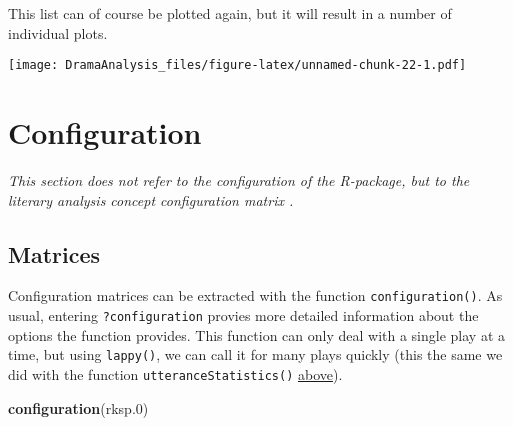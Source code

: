 \documentclass[]{book}
\newenvironment{Shaded}{\begin{snugshade}}{\end{snugshade}}
\newcommand{\ControlFlowTok}[1]{\textcolor[rgb]{0.13,0.29,0.53}{\textbf{#1}}}
\newcommand{\DataTypeTok}[1]{\textcolor[rgb]{0.13,0.29,0.53}{#1}}
\newcommand{\DecValTok}[1]{\textcolor[rgb]{0.00,0.00,0.81}{#1}}
\newcommand{\FloatTok}[1]{\textcolor[rgb]{0.00,0.00,0.81}{#1}}
\newcommand{\KeywordTok}[1]{\textcolor[rgb]{0.13,0.29,0.53}{\textbf{#1}}}
\newcommand{\NormalTok}[1]{#1}
\newcommand{\OperatorTok}[1]{\textcolor[rgb]{0.81,0.36,0.00}{\textbf{#1}}}
\newcommand{\StringTok}[1]{\textcolor[rgb]{0.31,0.60,0.02}{#1}}
\begin{document}
This list can of course be plotted again, but it will result in a number of individual plots.

\begin{Shaded}
\end{Shaded}

\texttt{[image: DramaAnalysis\_files/figure-latex/unnamed-chunk-22-1.pdf]}

\hypertarget{configuration}{%
\chapter{Configuration}\label{configuration}}

\emph{This section does not refer to the configuration of the R-package, but to the literary analysis concept configuration matrix \citep{Pfister:1988aa}.}

\hypertarget{matrices}{%
\section{Matrices}\label{matrices}}

Configuration matrices can be extracted with the function \texttt{configuration()}. As usual, entering \texttt{?configuration} provies more detailed information about the options the function provides. This function can only deal with a single play at a time, but using \texttt{lappy()}, we can call it for many plays quickly (this the same we did with the function \texttt{utteranceStatistics()} \protect\hyperlink{who-how-often-collection}{above}).

\begin{Shaded}
\begin{Highlighting}[]
\KeywordTok{configuration}\NormalTok{(rksp}\FloatTok{.0}\NormalTok{)}
\end{Highlighting}
\end{Shaded}
\end{document}
